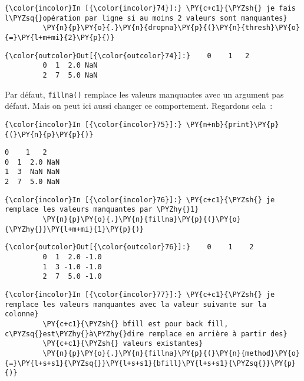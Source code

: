     \begin{Verbatim}[commandchars=\\\{\}]
{\color{incolor}In [{\color{incolor}74}]:} \PY{c+c1}{\PYZsh{} je fais l\PYZsq{}opération par ligne si au moins 2 valeurs sont manquantes}
         \PY{n}{p}\PY{o}{.}\PY{n}{dropna}\PY{p}{(}\PY{n}{thresh}\PY{o}{=}\PY{l+m+mi}{2}\PY{p}{)}
\end{Verbatim}


\begin{Verbatim}[commandchars=\\\{\}]
{\color{outcolor}Out[{\color{outcolor}74}]:}    0    1   2
         0  1  2.0 NaN
         2  7  5.0 NaN
\end{Verbatim}
            
    Par défaut, \texttt{fillna()} remplace les valeurs manquantes avec un
argument pas défaut. Mais on peut ici aussi changer ce comportement.
Regardons cela~:

    \begin{Verbatim}[commandchars=\\\{\}]
{\color{incolor}In [{\color{incolor}75}]:} \PY{n+nb}{print}\PY{p}{(}\PY{n}{p}\PY{p}{)}
\end{Verbatim}


    \begin{Verbatim}[commandchars=\\\{\}]
   0    1   2
0  1  2.0 NaN
1  3  NaN NaN
2  7  5.0 NaN

    \end{Verbatim}

    \begin{Verbatim}[commandchars=\\\{\}]
{\color{incolor}In [{\color{incolor}76}]:} \PY{c+c1}{\PYZsh{} je remplace les valeurs manquantes par \PYZhy{}1}
         \PY{n}{p}\PY{o}{.}\PY{n}{fillna}\PY{p}{(}\PY{o}{\PYZhy{}}\PY{l+m+mi}{1}\PY{p}{)}
\end{Verbatim}


\begin{Verbatim}[commandchars=\\\{\}]
{\color{outcolor}Out[{\color{outcolor}76}]:}    0    1    2
         0  1  2.0 -1.0
         1  3 -1.0 -1.0
         2  7  5.0 -1.0
\end{Verbatim}
            
    \begin{Verbatim}[commandchars=\\\{\}]
{\color{incolor}In [{\color{incolor}77}]:} \PY{c+c1}{\PYZsh{} je remplace les valeurs manquantes avec la valeur suivante sur la colonne}
         \PY{c+c1}{\PYZsh{} bfill est pour back fill, c\PYZsq{}est\PYZhy{}à\PYZhy{}dire remplace en arrière à partir des}
         \PY{c+c1}{\PYZsh{} valeurs existantes}
         \PY{n}{p}\PY{o}{.}\PY{n}{fillna}\PY{p}{(}\PY{n}{method}\PY{o}{=}\PY{l+s+s1}{\PYZsq{}}\PY{l+s+s1}{bfill}\PY{l+s+s1}{\PYZsq{}}\PY{p}{)}
\end{Verbatim}


